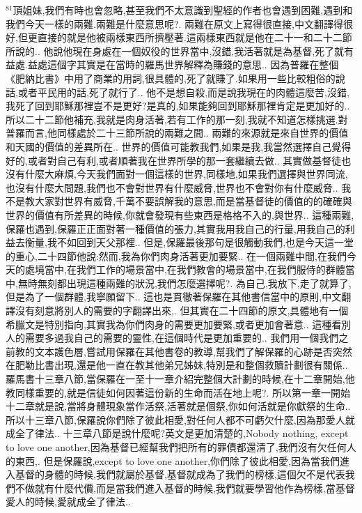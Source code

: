 \documentclass{book}
\begin{document}
$^{81}$頂姐妹,我們有時也會忽略,甚至我們不太意識到聖經的作者也會遇到困難,遇到和我們今天一樣的兩難.兩難是什麼意思呢?.
兩難在原文上寫得很直接,中文翻譯得很好,但更直接的就是他被兩樣東西所擠壓著.這兩樣東西就是他在二十一和二十二節所說的..
他說他現在身處在一個奴役的世界當中,沒錯,我活著就是為基督,死了就有益處.益處這個字其實是在當時的羅馬世界解釋為賺錢的意思..
因為普羅在整個《肥納比書》中用了商業的用詞,很具體的,死了就賺了.如果用一些比較粗俗的說話,或者平民用的話,死了就行了..
他不是想自殺,而是說我現在的肉體這麼苦,沒錯,我死了回到耶穌那裡豈不是更好?是真的,如果能夠回到耶穌那裡肯定是更加好的..
所以二十二節他補充,我就是肉身活著,若有工作的那一刻,我就不知道怎樣挑選.對普羅而言,他同樣處於二十三節所說的兩難之間..
兩難的來源就是來自世界的價值和天國的價值的差異所在..
世界的價值可能教我們,如果是我,我當然選擇自己覺得好的,或者對自己有利,或者順著我在世界所學的那一套繼續去做..
其實做基督徒也沒有什麼大麻煩,今天我們面對一個這樣的世界,同樣地,如果我們選擇與世界同流,也沒有什麼大問題,我們也不會對世界有什麼威脅,世界也不會對你有什麼威脅..
我不是教大家對世界有威脅,千萬不要誤解我的意思,而是當基督徒的價值的的確確與世界的價值有所差異的時候,你就會發現有些東西是格格不入的,與世界..
這種兩難,保羅也遇到,保羅正正面對著一種價值的張力,其實我用我自己的行量,用我自己的利益去衡量,我不如回到天父那裡..
但是,保羅最後那句是很觸動我們,也是今天這一堂的重心,二十四節他說:然而,我為你們肉身活著更加要緊..
在一個兩難中間,在我們今天的處境當中,在我們工作的場景當中,在我們教會的場景當中,在我們服侍的群體當中,無時無刻都出現這種兩難的狀況,我們怎麼選擇呢?.
為自己,我放下,走了就算了,但是為了一個群體,我寧願留下..
這也是貫徹著保羅在其他書信當中的原則,中文翻譯沒有刻意將別人的需要的字翻譯出來,.
但其實在二十四節的原文,具體地有一個希臘文是特別指向,其實我為你們肉身的需要更加要緊,或者更加會著意..
這種看別人的需要多過我自己的需要的靈性,在這個時代是更加重要的..
我們用一個我們之前教的文本護色層,嘗試用保羅在其他書卷的教導,幫我們了解保羅的心跡是否突然在肥勒比書出現,還是他一直在教其他弟兄姊妹,特別是和整個救贖計劃很有關係..
羅馬書十三章八節,當保羅在一至十一章介紹完整個大計劃的時候,在十二章開始,他教同樣重要的,就是信徒如何因著這份新的生命而活在地上呢?.
所以第一章一開始十二章就是說,當將身體現象當作活祭,活著就是個祭,你如何活就是你獻祭的生命..
所以十三章八節,保羅說你們除了彼此相愛,對任何人都不可虧欠什麼,因為那愛人就成全了律法..
十三章八節是說什麼呢?英文是更加清楚的,Nobody nothing, except to love one another,因為基督已經幫我們把所有的罪債都還清了,我們沒有欠任何人的東西,.
但是保羅說,except to love one another,你們除了彼此相愛,因為當我們進入基督的身體的時候,我們就屬於基督,基督就成為了我們的榜樣,這個欠不是代表我們不做就有什麼代價,而是當我們進入基督的時候,我們就要學習他作為榜樣,當基督愛人的時候,愛就成全了律法..
\end{document}
